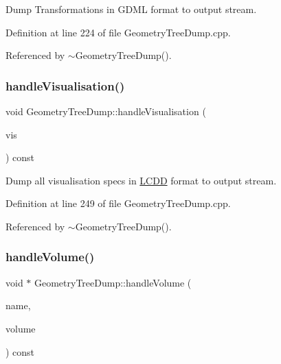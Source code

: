 Dump Transformations in G\+D\+ML format to output stream. 



Definition at line 224 of file Geometry\+Tree\+Dump.\+cpp.



Referenced by $\sim$\+Geometry\+Tree\+Dump().

\hypertarget{class_d_d4hep_1_1_geometry_1_1_geometry_tree_dump_a94102672b7b7c29426434fc1057c7334}{}\label{class_d_d4hep_1_1_geometry_1_1_geometry_tree_dump_a94102672b7b7c29426434fc1057c7334} 
\subsubsection{\texorpdfstring{handle\+Visualisation()}{handleVisualisation()}}
{\footnotesize\ttfamily void Geometry\+Tree\+Dump\+::handle\+Visualisation (\begin{DoxyParamCaption}\item[{const \hyperlink{class_d_d4hep_1_1_geometry_1_1_l_c_d_d_a05cb11e7355772c7b0794bcca59bf477}{L\+C\+D\+D\+::\+Handle\+Map} \&}]{vis }\end{DoxyParamCaption}) const}



Dump all visualisation specs in \hyperlink{class_d_d4hep_1_1_geometry_1_1_l_c_d_d}{L\+C\+DD} format to output stream. 



Definition at line 249 of file Geometry\+Tree\+Dump.\+cpp.



Referenced by $\sim$\+Geometry\+Tree\+Dump().

\hypertarget{class_d_d4hep_1_1_geometry_1_1_geometry_tree_dump_adadccb419b182e479e87f793447700f2}{}\label{class_d_d4hep_1_1_geometry_1_1_geometry_tree_dump_adadccb419b182e479e87f793447700f2} 
\subsubsection{\texorpdfstring{handle\+Volume()}{handleVolume()}}
{\footnotesize\ttfamily void $\ast$ Geometry\+Tree\+Dump\+::handle\+Volume (\begin{DoxyParamCaption}\item[{const std\+::string \&}]{name,  }\item[{\hyperlink{class_d_d4hep_1_1_geometry_1_1_volume}{Volume}}]{volume }\end{DoxyParamCaption}) const\hspace{0.3cm}{\ttfamily [virtual]}}



